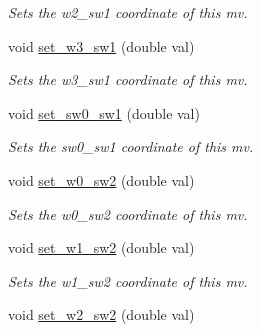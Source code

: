\begin{DoxyCompactItemize}
\begin{DoxyCompactList}\small\item\em Sets the w2\-\_\-sw1 coordinate of this mv. \end{DoxyCompactList}\item 
\hypertarget{classe3ga_1_1mv_aae859a276851e16da31508decdd57d70}{void \hyperlink{classe3ga_1_1mv_aae859a276851e16da31508decdd57d70}{set\-\_\-w3\-\_\-sw1} (double val)}\label{classe3ga_1_1mv_aae859a276851e16da31508decdd57d70}

\begin{DoxyCompactList}\small\item\em Sets the w3\-\_\-sw1 coordinate of this mv. \end{DoxyCompactList}\item 
\hypertarget{classe3ga_1_1mv_a7049e0b302fc8d677bd82b53e7b532b2}{void \hyperlink{classe3ga_1_1mv_a7049e0b302fc8d677bd82b53e7b532b2}{set\-\_\-sw0\-\_\-sw1} (double val)}\label{classe3ga_1_1mv_a7049e0b302fc8d677bd82b53e7b532b2}

\begin{DoxyCompactList}\small\item\em Sets the sw0\-\_\-sw1 coordinate of this mv. \end{DoxyCompactList}\item 
\hypertarget{classe3ga_1_1mv_a94dbacb876864ce5c60e4722d7568956}{void \hyperlink{classe3ga_1_1mv_a94dbacb876864ce5c60e4722d7568956}{set\-\_\-w0\-\_\-sw2} (double val)}\label{classe3ga_1_1mv_a94dbacb876864ce5c60e4722d7568956}

\begin{DoxyCompactList}\small\item\em Sets the w0\-\_\-sw2 coordinate of this mv. \end{DoxyCompactList}\item 
\hypertarget{classe3ga_1_1mv_a1830f345000f001651e240d930169f75}{void \hyperlink{classe3ga_1_1mv_a1830f345000f001651e240d930169f75}{set\-\_\-w1\-\_\-sw2} (double val)}\label{classe3ga_1_1mv_a1830f345000f001651e240d930169f75}

\begin{DoxyCompactList}\small\item\em Sets the w1\-\_\-sw2 coordinate of this mv. \end{DoxyCompactList}\item 
\hypertarget{classe3ga_1_1mv_ad429fd48cc171e07b460e7fcc9868cf1}{void \hyperlink{classe3ga_1_1mv_ad429fd48cc171e07b460e7fcc9868cf1}{set\-\_\-w2\-\_\-sw2} (double val)}\label{classe3ga_1_1mv_ad429fd48cc171e07b460e7fcc9868cf1}


\end{DoxyCompactItemize}
